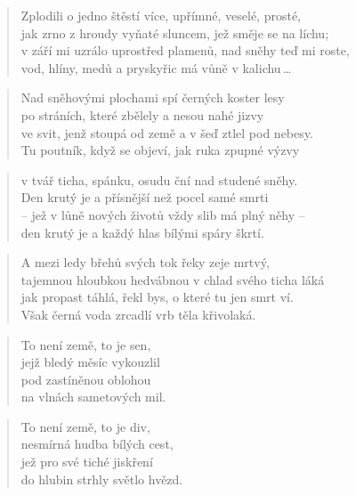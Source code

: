 \documentclass{book}
\begin{document}
\begin{verse}
Zplodili o jedno štěstí více, upřímné, veselé, prosté,\\
jak zrno z hroudy vyňaté sluncem, jež směje se na líchu;\\
v září mi uzrálo uprostřed plamenů, nad sněhy teď mi roste,\\
vod, hlíny, medů a pryskyřic má vůně v kalichu\,\ldots
\end{verse}
\newpage
{}
\begin{verse}
Nad sněhovými plochami spí černých koster lesy\\
po stráních, které zbělely a nesou nahé jizvy\\
ve svit, jenž stoupá od země a v šeď ztlel pod nebesy.\\
Tu poutník, když se objeví, jak ruka zpupné výzvy
\end{verse}
\begin{verse}
v tvář ticha, spánku, osudu ční nad studené sněhy.\\
Den krutý je a přísnější než pocel samé smrti\\
-- jež v lůně nových životů vždy slib má plný něhy --\\
den krutý je a každý hlas bílými spáry škrtí.
\end{verse}
\begin{verse}
A mezi ledy břehů svých tok řeky zeje mrtvý,\\
tajemnou hloubkou hedvábnou v chlad svého ticha láká\\
jak propast táhlá, řekl bys, o které tu jen smrt ví.\\
Však černá voda zrcadlí vrb těla křivolaká.
\end{verse}
\newpage
{}
\begin{verse}
To není země, to je sen,\\
jejž bledý měsíc vykouzlil\\
pod zastíněnou oblohou\\
na vlnách sametových mil.
\end{verse}
\begin{verse}
To není země, to je div,\\
nesmírná hudba bílých cest,\\
jež pro své tiché jiskření\\
do hlubin strhly světlo hvězd.
\end{verse}
\end{document}
